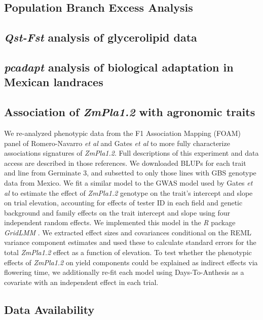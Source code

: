 \documentclass[9pt,twocolumn,twoside,lineno]{gsajnl}
\begin{document}
\subsection{Population Branch Excess Analysis}

\subsection{\textit{Qst-Fst} analysis of glycerolipid data}

\subsection{\textit{pcadapt} analysis of biological adaptation in Mexican landraces}

\subsection*{Association of \textit{ZmPla1.2} with agronomic traits}
We re-analyzed phenotypic data from the F1 Association Mapping (FOAM) panel of Romero-Navarro \textit{et al} \cite{Romero_Navarro2017-cn} and Gates \textit{et al} \cite{Gates2019-xu} to more fully characterize associations signatures of \textit{ZmPla1.2}. 
Full descriptions of this experiment and data access are described in those references. 
We downloaded BLUPs for each trait and line from Germinate 3, and subsetted to only those lines with GBS genotype data from Mexico. 
We fit a similar model to the GWAS model used by Gates \textit{et al} \cite{Gates2019-xu} to estimate the effect of \textit{ZmPla1.2} genotype on the trait's intercept and slope on trial elevation, accounting for effects of tester ID in each field and genetic background and family effects on the trait intercept and slope using four independent random effects. 
We implemented this model in the \textit{R} package \textit{GridLMM} \cite{GridLMM2019}. 
We extracted effect sizes and covariances conditional on the REML variance component estimates and used these to calculate standard errors for the total \textit{ZmPla1.2} effect as a function of elevation. 
To test whether the phenotypic effects of \textit{ZmPla1.2} on yield components could be explained as indirect effects via flowering time, we additionally re-fit each model using Days-To-Anthesis as a covariate with an independent effect in each trial.

\subsection{Data Availability}
\end{document}
